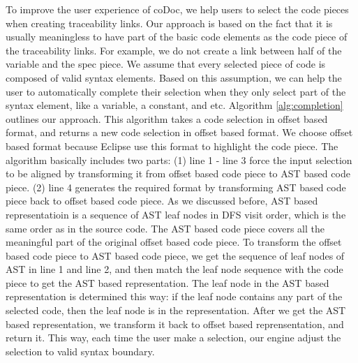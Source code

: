 To improve the user experience of coDoc, we help users to select the code pieces when creating traceability links.
Our approach is based on the fact that it is usually meaningless to have part of the basic code elements as the code piece of the traceability links.
For example, we do not create a link between half of the variable and the spec piece.
We assume that every selected piece of code is composed of valid syntax elements.
Based on this assumption, we can help the user to automatically complete their selection when they only select part of the syntax element, like a variable, a constant, and etc. 
Algorithm \ref{alg:completion} outlines our approach.
This algorithm takes a code selection in offset based format,
and returns a new code selection in offset based format.
We choose offset based format because Eclipse use this format to highlight the code piece.
The algorithm basically includes two parts: (1) line 1 - line 3 force the input selection to be aligned by transforming it from offset based code piece to AST based code piece. (2) line 4 generates the required format by transforming AST based code piece back to offset based code piece.
As we discussed before, AST based representatioin is a sequence of AST leaf nodes in DFS visit order, which is the same order as in the source code.
The AST based code piece covers all the meaningful part of the original offset based code piece.
To transform the offset based code piece to AST based code piece, 
we get the sequence of leaf nodes of AST in line 1 and line 2,
and then match the leaf node sequence with the code piece to get the AST based representation.
The leaf node in the AST based representation is determined this way: if the leaf node contains any part of the selected code, then the leaf node is in the representation.
After we get the AST based representation,
we transform it back to offset based reprensentation, and return it.
This way, each time the user make a selection,
our engine adjust the selection to valid syntax boundary.

